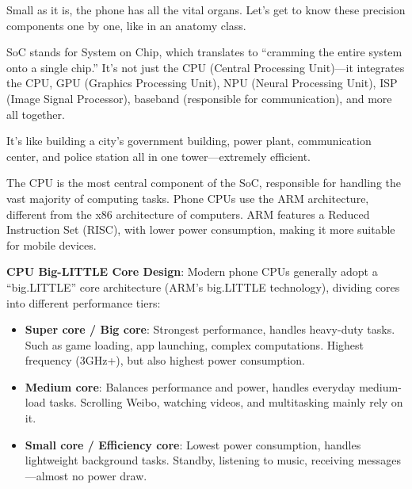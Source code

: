


Small as it is, the phone has all the vital organs. Let's get to know these precision components one by one, like in an anatomy class.


SoC stands for System on Chip, which translates to “cramming the entire system onto a single chip.” It's not just the CPU (Central Processing Unit)—it integrates the CPU, GPU (Graphics Processing Unit), NPU (Neural Processing Unit), ISP (Image Signal Processor), baseband (responsible for communication), and more all together.

It's like building a city's government building, power plant, communication center, and police station all in one tower—extremely efficient.


The CPU is the most central component of the SoC, responsible for handling the vast majority of computing tasks. Phone CPUs use the ARM architecture, different from the x86 architecture of computers. ARM features a Reduced Instruction Set (RISC), with lower power consumption, making it more suitable for mobile devices.

\textbf{CPU Big-LITTLE Core Design}: Modern phone CPUs generally adopt a “big.LITTLE” core architecture (ARM's big.LITTLE technology), dividing cores into different performance tiers:

\begin{itemize}
  \item \textbf{Super core / Big core}: Strongest performance, handles heavy-duty tasks. Such as game loading, app launching, complex computations. Highest frequency (3GHz+), but also highest power consumption.
  \item \textbf{Medium core}: Balances performance and power, handles everyday medium-load tasks. Scrolling Weibo, watching videos, and multitasking mainly rely on it.
  \item \textbf{Small core / Efficiency core}: Lowest power consumption, handles lightweight background tasks. Standby, listening to music, receiving messages—almost no power draw.
\end{itemize}

